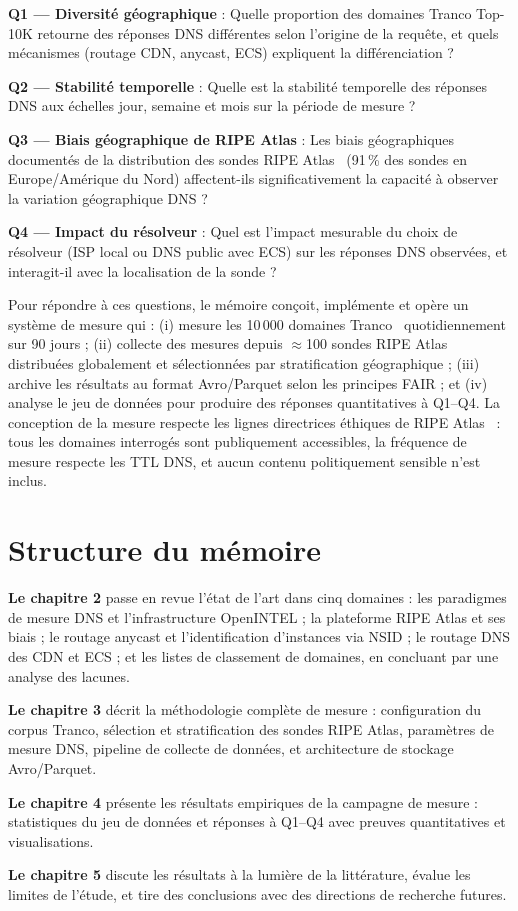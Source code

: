 \textbf{Q1 --- Diversité géographique} : Quelle proportion des domaines Tranco Top-10K retourne des réponses DNS différentes selon l'origine de la requête, et quels mécanismes (routage CDN, anycast, ECS) expliquent la différenciation ?

\textbf{Q2 --- Stabilité temporelle} : Quelle est la stabilité temporelle des réponses DNS aux échelles jour, semaine et mois sur la période de mesure ?

\textbf{Q3 --- Biais géographique de RIPE Atlas} : Les biais géographiques documentés de la distribution des sondes RIPE Atlas~\cite{Bajpai2017} (91\,\% des sondes en Europe/Amérique du Nord) affectent-ils significativement la capacité à observer la variation géographique DNS ?

\textbf{Q4 --- Impact du résolveur} : Quel est l'impact mesurable du choix de résolveur (ISP local ou DNS public avec ECS) sur les réponses DNS observées, et interagit-il avec la localisation de la sonde ?

Pour répondre à ces questions, le mémoire conçoit, implémente et opère un système de mesure qui : (i) mesure les 10\,000 domaines Tranco~\cite{LePochat2019} quotidiennement sur 90 jours ; (ii) collecte des mesures depuis $\approx$100 sondes RIPE Atlas distribuées globalement et sélectionnées par stratification géographique ; (iii) archive les résultats au format Avro/Parquet selon les principes FAIR ; et (iv) analyse le jeu de données pour produire des réponses quantitatives à Q1--Q4. La conception de la mesure respecte les lignes directrices éthiques de RIPE Atlas~\cite{Kisteleki2016} : tous les domaines interrogés sont publiquement accessibles, la fréquence de mesure respecte les TTL DNS, et aucun contenu politiquement sensible n'est inclus.

\section{Structure du mémoire}
\label{sec:1.3}

\textbf{Le chapitre 2} passe en revue l'état de l'art dans cinq domaines : les paradigmes de mesure DNS et l'infrastructure OpenINTEL ; la plateforme RIPE Atlas et ses biais ; le routage anycast et l'identification d'instances via NSID ; le routage DNS des CDN et ECS ; et les listes de classement de domaines, en concluant par une analyse des lacunes.

\textbf{Le chapitre 3} décrit la méthodologie complète de mesure : configuration du corpus Tranco, sélection et stratification des sondes RIPE Atlas, paramètres de mesure DNS, pipeline de collecte de données, et architecture de stockage Avro/Parquet.

\textbf{Le chapitre 4} présente les résultats empiriques de la campagne de mesure : statistiques du jeu de données et réponses à Q1--Q4 avec preuves quantitatives et visualisations.

\textbf{Le chapitre 5} discute les résultats à la lumière de la littérature, évalue les limites de l'étude, et tire des conclusions avec des directions de recherche futures.
